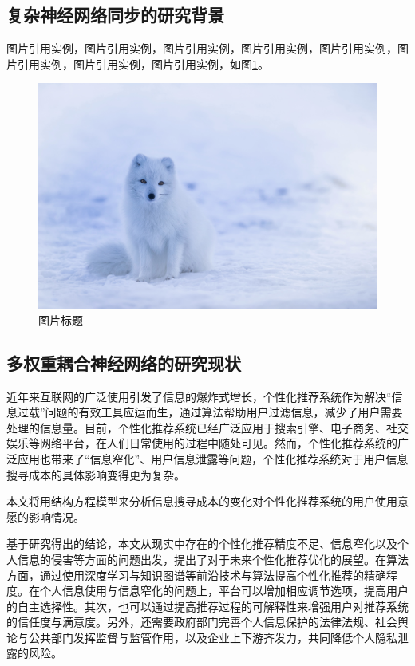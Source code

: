 \documentclass[a4paper,zihao=-4,UTF8]{ctexart}
\numberwithin{equation}{section}
\begin{document}
	\subsection{复杂神经网络同步的研究背景}
	图片引用实例，图片引用实例，图片引用实例，图片引用实例，图片引用实例，图片引用实例，图片引用实例，图片引用实例，如图\ref{fig:1-1}。
	\begin{figure}[h]
		\centering
		\includegraphics[scale = .5]{./image/test.jpg}
		\caption{图片标题}
		\label{fig:1-1}
	\end{figure}
	\subsection{多权重耦合神经网络的研究现状}
	近年来互联网的广泛使用引发了信息的爆炸式增长，个性化推荐系统作为解决“信息过载”问题的有效工具应运而生，通过算法帮助用户过滤信息，减少了用户需要处理的信息量。目前，个性化推荐系统已经广泛应用于搜索引擎、电子商务、社交娱乐等网络平台，在人们日常使用的过程中随处可见。然而，个性化推荐系统的广泛应用也带来了“信息窄化”、用户信息泄露等问题，个性化推荐系统对于用户信息搜寻成本的具体影响变得更为复杂。
	
	本文将用结构方程模型来分析信息搜寻成本的变化对个性化推荐系统的用户使用意愿的影响情况。
	
	基于研究得出的结论，本文从现实中存在的个性化推荐精度不足、信息窄化以及个人信息的侵害等方面的问题出发，提出了对于未来个性化推荐优化的展望。在算法方面，通过使用深度学习与知识图谱等前沿技术与算法提高个性化推荐的精确程度。在个人信息使用与信息窄化的问题上，平台可以增加相应调节选项，提高用户的自主选择性。其次，也可以通过提高推荐过程的可解释性来增强用户对推荐系统的信任度与满意度。另外，还需要政府部门完善个人信息保护的法律法规、社会舆论与公共部门发挥监督与监管作用，以及企业上下游齐发力，共同降低个人隐私泄露的风险。
\end{document}
